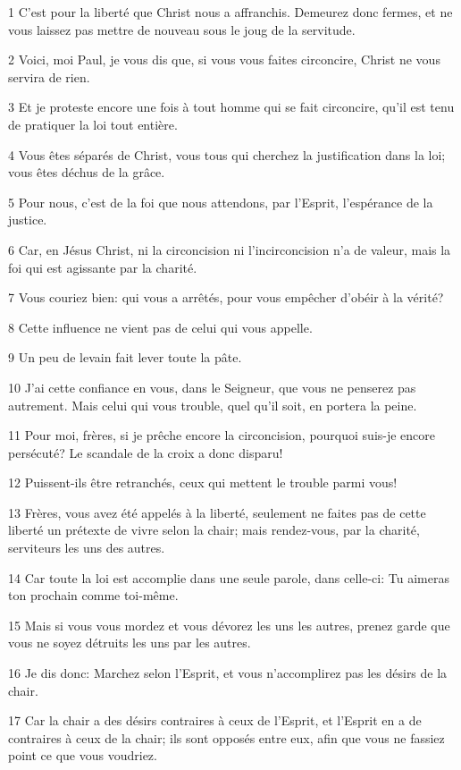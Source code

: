 \par 1 C'est pour la liberté que Christ nous a affranchis. Demeurez donc fermes, et ne vous laissez pas mettre de nouveau sous le joug de la servitude.
\par 2 Voici, moi Paul, je vous dis que, si vous vous faites circoncire, Christ ne vous servira de rien.
\par 3 Et je proteste encore une fois à tout homme qui se fait circoncire, qu'il est tenu de pratiquer la loi tout entière.
\par 4 Vous êtes séparés de Christ, vous tous qui cherchez la justification dans la loi; vous êtes déchus de la grâce.
\par 5 Pour nous, c'est de la foi que nous attendons, par l'Esprit, l'espérance de la justice.
\par 6 Car, en Jésus Christ, ni la circoncision ni l'incirconcision n'a de valeur, mais la foi qui est agissante par la charité.
\par 7 Vous couriez bien: qui vous a arrêtés, pour vous empêcher d'obéir à la vérité?
\par 8 Cette influence ne vient pas de celui qui vous appelle.
\par 9 Un peu de levain fait lever toute la pâte.
\par 10 J'ai cette confiance en vous, dans le Seigneur, que vous ne penserez pas autrement. Mais celui qui vous trouble, quel qu'il soit, en portera la peine.
\par 11 Pour moi, frères, si je prêche encore la circoncision, pourquoi suis-je encore persécuté? Le scandale de la croix a donc disparu!
\par 12 Puissent-ils être retranchés, ceux qui mettent le trouble parmi vous!
\par 13 Frères, vous avez été appelés à la liberté, seulement ne faites pas de cette liberté un prétexte de vivre selon la chair; mais rendez-vous, par la charité, serviteurs les uns des autres.
\par 14 Car toute la loi est accomplie dans une seule parole, dans celle-ci: Tu aimeras ton prochain comme toi-même.
\par 15 Mais si vous vous mordez et vous dévorez les uns les autres, prenez garde que vous ne soyez détruits les uns par les autres.
\par 16 Je dis donc: Marchez selon l'Esprit, et vous n'accomplirez pas les désirs de la chair.
\par 17 Car la chair a des désirs contraires à ceux de l'Esprit, et l'Esprit en a de contraires à ceux de la chair; ils sont opposés entre eux, afin que vous ne fassiez point ce que vous voudriez.

